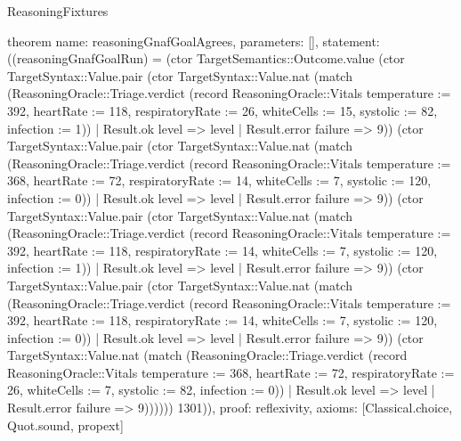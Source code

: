 \begin{lexlean}{ReasoningFixtures}
\begin{semanticmodule}
theorem{
  name: reasoningGnafGoalAgrees,
  parameters: [],
  statement: ((reasoningGnafGoalRun) = (ctor TargetSemantics::Outcome.value (ctor TargetSyntax::Value.pair (ctor TargetSyntax::Value.nat (match (ReasoningOracle::Triage.verdict (record ReasoningOracle::Vitals {temperature := 392, heartRate := 118, respiratoryRate := 26, whiteCells := 15, systolic := 82, infection := 1}))
    | Result.ok level => level
    | Result.error failure => 9)) (ctor TargetSyntax::Value.pair (ctor TargetSyntax::Value.nat (match (ReasoningOracle::Triage.verdict (record ReasoningOracle::Vitals {temperature := 368, heartRate := 72, respiratoryRate := 14, whiteCells := 7, systolic := 120, infection := 0}))
    | Result.ok level => level
    | Result.error failure => 9)) (ctor TargetSyntax::Value.pair (ctor TargetSyntax::Value.nat (match (ReasoningOracle::Triage.verdict (record ReasoningOracle::Vitals {temperature := 392, heartRate := 118, respiratoryRate := 14, whiteCells := 7, systolic := 120, infection := 1}))
    | Result.ok level => level
    | Result.error failure => 9)) (ctor TargetSyntax::Value.pair (ctor TargetSyntax::Value.nat (match (ReasoningOracle::Triage.verdict (record ReasoningOracle::Vitals {temperature := 392, heartRate := 118, respiratoryRate := 14, whiteCells := 7, systolic := 120, infection := 0}))
    | Result.ok level => level
    | Result.error failure => 9)) (ctor TargetSyntax::Value.nat (match (ReasoningOracle::Triage.verdict (record ReasoningOracle::Vitals {temperature := 368, heartRate := 72, respiratoryRate := 26, whiteCells := 7, systolic := 82, infection := 0}))
    | Result.ok level => level
    | Result.error failure => 9)))))) 1301)),
  proof: reflexivity{},
  axioms: [Classical.choice, Quot.sound, propext]
}


\end{semanticmodule}
\end{lexlean}
